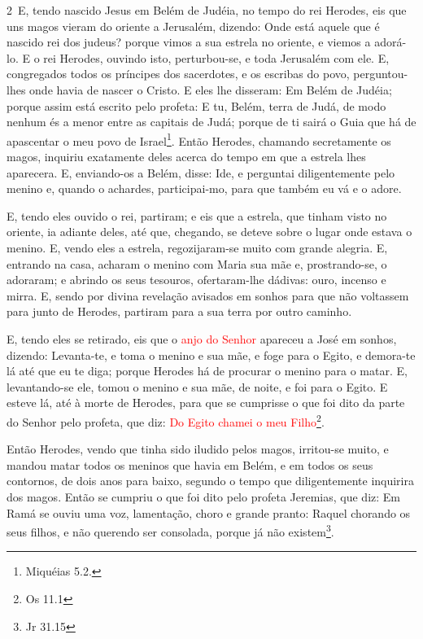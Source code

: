 \medskip

\lettrine{2}\ E, tendo nascido Jesus em Belém de Judéia, no
tempo do rei Herodes, eis que uns magos vieram do oriente a
Jerusalém, dizendo: Onde está aquele que é nascido rei dos
judeus? porque vimos a sua estrela no oriente, e viemos a adorá-lo.
E o rei Herodes, ouvindo isto, perturbou-se, e toda Jerusalém
com ele. E, congregados todos os príncipes dos sacerdotes, e os
escribas do povo, perguntou-lhes onde havia de nascer o Cristo.
E eles lhe disseram: Em Belém de Judéia; porque assim está
escrito pelo profeta: E tu, Belém, terra de Judá, de modo nenhum
és a menor entre as capitais de Judá; porque de ti sairá o Guia que
há de apascentar o meu povo de Israel\footnote{Miquéias 5.2.}.
Então Herodes, chamando secretamente os magos, inquiriu
exatamente deles acerca do tempo em que a estrela lhes aparecera.
E, enviando-os a Belém, disse: Ide, e perguntai diligentemente
pelo menino e, quando o achardes, participai-mo, para que também eu
vá e o adore.

E, tendo eles ouvido o rei, partiram; e eis que a estrela, que
tinham visto no oriente, ia adiante deles, até que, chegando, se
deteve sobre o lugar onde estava o menino. E, vendo eles a
estrela, regozijaram-se muito com grande alegria. E, entrando
na casa, acharam o menino com Maria sua mãe e, prostrando-se, o
adoraram; e abrindo os seus tesouros, ofertaram-lhe dádivas: ouro,
incenso e mirra. E, sendo por divina revelação avisados em
sonhos para que não voltassem para junto de Herodes, partiram para a
sua terra por outro caminho.

E, tendo eles se retirado, eis que o \textcolor{red}{anjo do Senhor}
apareceu a José em sonhos, dizendo: Levanta-te, e toma o menino e
sua mãe, e foge para o Egito, e demora-te lá até que eu te diga;
porque Herodes há de procurar o menino para o matar. E,
levantando-se ele, tomou o menino e sua mãe, de noite, e foi para o
Egito. E esteve lá, até à morte de Herodes, para que se
cumprisse o que foi dito da parte do Senhor pelo profeta, que diz:
\textcolor{red}{Do Egito chamei o meu Filho}\footnote{Os 11.1}.

Então Herodes, vendo que tinha sido iludido pelos magos,
irritou-se muito, e mandou matar todos os meninos que havia em
Belém, e em todos os seus contornos, de dois anos para baixo,
segundo o tempo que diligentemente inquirira dos magos. Então
se cumpriu o que foi dito pelo profeta Jeremias, que diz: Em
Ramá se ouviu uma voz, lamentação, choro e grande pranto: Raquel
chorando os seus filhos, e não querendo ser consolada, porque já não
existem\footnote{Jr 31.15}.

